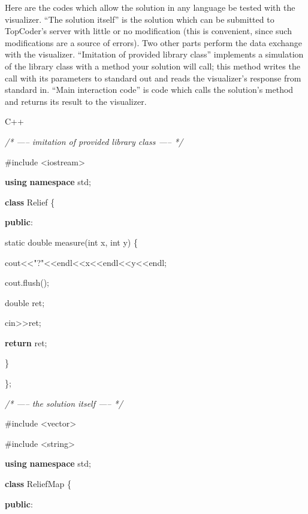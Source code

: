 \documentclass[]{article}
\newenvironment{Shaded}{}{}
\newcommand{\AttributeTok}[1]{\textcolor[rgb]{0.49,0.56,0.16}{#1}}
\newcommand{\CommentTok}[1]{\textcolor[rgb]{0.38,0.63,0.69}{\textit{#1}}}
\newcommand{\ControlFlowTok}[1]{\textcolor[rgb]{0.00,0.44,0.13}{\textbf{#1}}}
\newcommand{\DataTypeTok}[1]{\textcolor[rgb]{0.56,0.13,0.00}{#1}}
\newcommand{\ImportTok}[1]{#1}
\newcommand{\KeywordTok}[1]{\textcolor[rgb]{0.00,0.44,0.13}{\textbf{#1}}}
\newcommand{\NormalTok}[1]{#1}
\newcommand{\PreprocessorTok}[1]{\textcolor[rgb]{0.74,0.48,0.00}{#1}}
\newcommand{\StringTok}[1]{\textcolor[rgb]{0.25,0.44,0.63}{#1}}
\begin{document}
Here are the codes which allow the solution in any language be tested
with the visualizer. ``The solution itself'' is the solution which can
be submitted to TopCoder's server with little or no modification (this
is convenient, since such modifications are a source of errors). Two
other parts perform the data exchange with the visualizer. ``Imitation
of provided library class'' implements a simulation of the library class
with a method your solution will call; this method writes the call with
its parameters to standard out and reads the visualizer's response from
standard in. ``Main interaction code'' is code which calls the
solution's method and returns its result to the visualizer.

C++

\begin{Shaded}
\begin{Highlighting}[]

\CommentTok{/* ----- imitation of provided library class ----- */}

\PreprocessorTok{#include }\ImportTok{<iostream>}

\KeywordTok{using} \KeywordTok{namespace}\NormalTok{ std;}

\KeywordTok{class}\NormalTok{ Relief \{}

   \KeywordTok{public}\NormalTok{:}

   \AttributeTok{static} \DataTypeTok{double}\NormalTok{ measure(}\DataTypeTok{int}\NormalTok{ x, }\DataTypeTok{int}\NormalTok{ y) \{}

\NormalTok{       cout<<}\StringTok{"?"}\NormalTok{<<endl<<x<<endl<<y<<endl;}

\NormalTok{       cout.flush();}

       \DataTypeTok{double}\NormalTok{ ret;}

\NormalTok{       cin>>ret;}

       \ControlFlowTok{return}\NormalTok{ ret;}

\NormalTok{   \}}

\NormalTok{\};}

\CommentTok{/* ----- the solution itself ----- */}

\PreprocessorTok{#include }\ImportTok{<vector>}

\PreprocessorTok{#include }\ImportTok{<string>}

\KeywordTok{using} \KeywordTok{namespace}\NormalTok{ std;}

\KeywordTok{class}\NormalTok{ ReliefMap \{}

   \KeywordTok{public}\NormalTok{:}


\end{Highlighting}
\end{Shaded}
\end{document}
